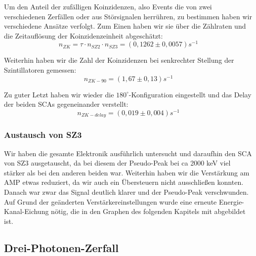 Um den Anteil der zufälligen Koinzidenzen, also Events die von zwei verschiedenen Zerfällen oder aus Störsignalen herrühren, zu bestimmen haben wir verschiedene Ansätze verfolgt. Zum Einen haben wir sie über die Zählraten und die Zeitauflösung der Koinzidenzeinheit abgeschätzt:
\begin{equation*}
 n_{ZK} = \tau \cdot n_{SZ2} \cdot n_{SZ3} = (0,1262 \pm 0,0057) s^{-1}
\end{equation*}

Weiterhin haben wir die Zahl der Koinzidenzen bei senkrechter Stellung der Szintillatoren gemessen:
\begin{equation*}
 n_{ZK-90} = (1,67  \pm  0,13) s^{-1}
\end{equation*}

Zu guter Letzt haben wir wieder die $180^\circ$-Konfiguration eingestellt und das Delay der beiden SCAs gegeneinander verstellt: 
\begin{equation*}
 n_{ZK-delay} = (0,019  \pm  0,004) s^{-1}
\end{equation*}

 

\subsubsection{Austausch von SZ3}
Wir haben die gesamte Elektronik ausführlich untersucht und daraufhin den SCA von SZ3 ausgetauscht, da bei diesem der Pseudo-Peak bei ca 2000 keV viel stärker als bei den anderen beiden war. Weiterhin haben wir die Verstärkung am AMP etwas reduziert, da wir auch ein Übersteuern nicht ausschließen konnten. Danach war zwar das Signal deutlich klarer und der Pseudo-Peak verschwunden. Auf Grund der geänderten Verstärkereinstellungen wurde eine erneute Energie-Kanal-Eichung nötig, die in den Graphen des folgenden Kapitels mit abgebildet ist. 

\subsection{Drei-Photonen-Zerfall}

